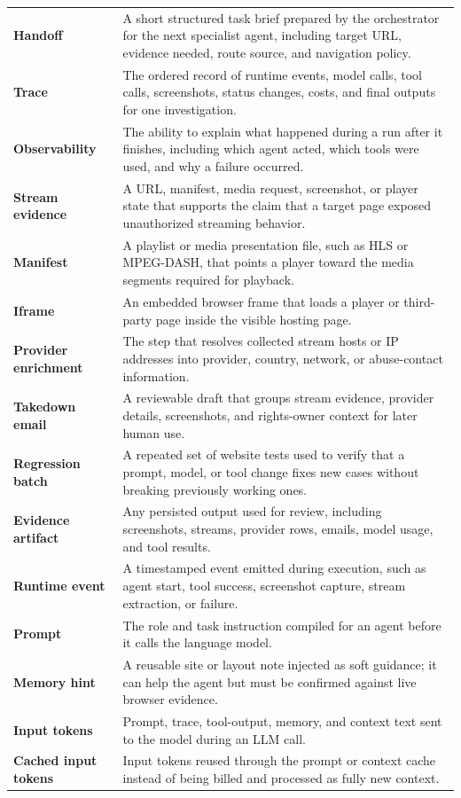 \begin{longtable}{>{\raggedright\arraybackslash\bfseries}p{4.1cm}
                  >{\raggedright\arraybackslash}p{9.7cm}}
Handoff & A short structured task brief prepared by the orchestrator for the next specialist agent, including target URL, evidence needed, route source, and navigation policy. \\
Trace & The ordered record of runtime events, model calls, tool calls, screenshots, status changes, costs, and final outputs for one investigation. \\
Observability & The ability to explain what happened during a run after it finishes, including which agent acted, which tools were used, and why a failure occurred. \\
Stream evidence & A URL, manifest, media request, screenshot, or player state that supports the claim that a target page exposed unauthorized streaming behavior. \\
Manifest & A playlist or media presentation file, such as HLS or MPEG-DASH, that points a player toward the media segments required for playback. \\
Iframe & An embedded browser frame that loads a player or third-party page inside the visible hosting page. \\
Provider enrichment & The step that resolves collected stream hosts or IP addresses into provider, country, network, or abuse-contact information. \\
Takedown email & A reviewable draft that groups stream evidence, provider details, screenshots, and rights-owner context for later human use. \\
Regression batch & A repeated set of website tests used to verify that a prompt, model, or tool change fixes new cases without breaking previously working ones. \\
Evidence artifact & Any persisted output used for review, including screenshots, streams, provider rows, emails, model usage, and tool results. \\
Runtime event & A timestamped event emitted during execution, such as agent start, tool success, screenshot capture, stream extraction, or failure. \\
Prompt & The role and task instruction compiled for an agent before it calls the language model. \\
Memory hint & A reusable site or layout note injected as soft guidance; it can help the agent but must be confirmed against live browser evidence. \\
Input tokens & Prompt, trace, tool-output, memory, and context text sent to the model during an LLM call. \\
Cached input tokens & Input tokens reused through the prompt or context cache instead of being billed and processed as fully new context. \\

\end{longtable}
